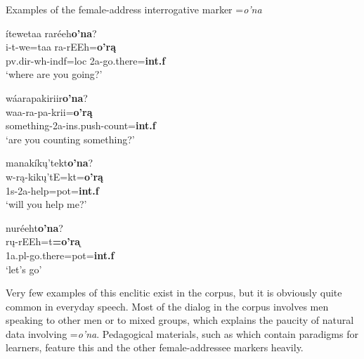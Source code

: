 \begin{exe}

\item\label{oPna} Examples of the female-address interrogative marker =\textit{o'na}

	\begin{xlist}
	
	\item\label{oPna1}
	\glll ítewetaa raréeh\textbf{o'na}?\\
	i-t-we=taa ra-rEEh=\textbf{o'rą}\\
	pv.dir-wh-indf=loc 2a-\textnormal{go.there}=\textbf{int.f}\\
	\glt `where are you going?' \citep[103]{hollow1973a}
	
	\item\label{oPna2}
	\glll wáarapakiriir\textbf{o'na}?\\
	waa-ra-pa-krii=\textbf{o'rą}\\
	\textnormal{something}-2a-ins.push-\textnormal{count}=\textbf{int.f}\\
	\glt `are you counting something?' \citep[457]{hollow1970}
	
	\item\label{oPna3}
	\glll manakíkų'tekt\textbf{o'na}?\\
	w-rą-kikų'tE=kt=\textbf{o'rą}\\
	1s-2a-\textnormal{help}=pot=\textbf{int.f}\\
	\glt `will you help me?' \citep[457]{hollow1970}

	\item\label{oPna4}
	\glll nuréeht\textbf{o'na}?\\
	rų-rEEh=t\textbf{=o'ra}̨\\
	1a.pl-\textnormal{go.there}=pot=\textbf{int.f}\\
	\glt `let's go' \citep[458]{hollow1970}
	
	\end{xlist}

\end{exe}

Very few examples of this enclitic exist in the corpus, but it is obviously quite common in everyday speech. Most of the dialog in the corpus involves men speaking to other men or to mixed groups, which explains the paucity of natural data involving =\textit{o'na}. Pedagogical materials, such as \citet{hollow1976} which contain paradigms for learners, feature this and the other female-addressee markers heavily.


